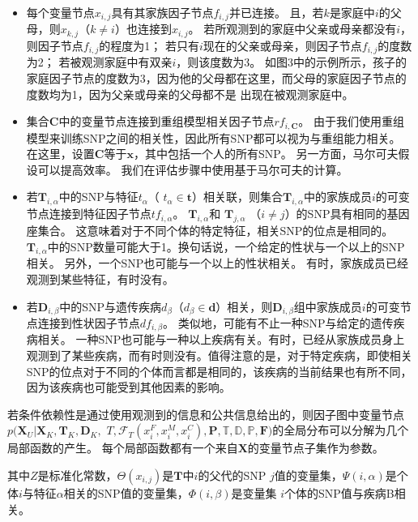 \begin{itemize}
	\item 每个变量节点$x_{i,j}$具有其家族因子节点$f_{i,j}$并已连接。 且，若$k$是家庭中$i$的父母，则$x_{k,j}$（$ k \neq i$）也连接到$x_{i,j}$。 若所观测到的家庭中父亲或母亲都没有$i$，则因子节点$f_{i,j}$的程度为1； 若只有$i$现在的父亲或母亲，则因子节点$f_{i,j}$的度数为2； 若被观测家庭中有双亲$i$，则该度数为3。 如图3中的示例所示，孩子的家庭因子节点的度数为3，因为他的父母都在这里，而父母的家庭因子节点的度数均为1，因为父亲或母亲的父母都不是 出现在被观测家庭中。
	\item 集合$\mathbf{C}$中的变量节点连接到重组模型相关因子节点$rf_{i,\mathbf{C}}$。 由于我们使用重组模型来训练SNP之间的相关性，因此所有SNP都可以视为与重组能力相关。 在这里，设置$\mathbf{C}$等于$\mathbf{x}$，其中包括一个人的所有SNP。 另一方面，马尔可夫假设可以提高效率。 我们在评估步骤中使用基于马尔可夫的计算。
	\item 若$\mathbf{T}_{i,\alpha}$中的SNP与特征$t_{\alpha}$（ $t_{\alpha} \in \mathbf{t}$）相关联，则集合$\mathbf{T}_{i,\alpha}$中的家族成员$i$的可变节点连接到特征因子节点$tf_{i,\alpha}$。 $\mathbf{T}_{i,\alpha}$和 $\mathbf{T}_{j,\alpha}$ （$i \neq j$）的SNP具有相同的基因座集合。 这意味着对于不同个体的特定特征，相关SNP的位点是相同的。 $\mathbf{T}_{i,\alpha}$中的SNP数量可能大于1。换句话说，一个给定的性状与一个以上的SNP相关。 另外，一个SNP也可能与一个以上的性状相关。 有时，家族成员已经观测到某些特征，有时没有。
	\item 若$\mathbf{D}_{i,\beta}$中的SNP与遗传疾病$d_{\beta}$（$d_{\beta} \in \mathbf{d}$）相关，则$\mathbf{D}_{i,\beta}$组中家族成员$i$的可变节点连接到性状因子节点$df_{i,\beta}$。 类似地，可能有不止一种SNP与给定的遗传疾病相关。 一种SNP也可能与一种以上疾病有关。有时，已经从家族成员身上观测到了某些疾病，而有时则没有。值得注意的是，对于特定疾病，即使相关SNP的位点对于不同的个体而言都是相同的，该疾病的当前结果也有所不同，因为该疾病也可能受到其他因素的影响。
	
\end{itemize}


若条件依赖性是通过使用观测到的信息和公共信息给出的，则因子图中变量节点$p(\mathbf{X}_U | \mathbf{X}_K, \mathbf{T}_K,\mathbf{D}_K,$ $T, \mathcal{F}_T(x_i^F, x_i^M, x_i^C), \mathbf{P}, \mathbb{T}, \mathbb{D}, \mathbb{P}, \mathbf{F})$的全局分布可以分解为几个局部函数的产生。 每个局部函数都有一个来自$\mathbf{X}$的变量节点子集作为参数。


其中$Z$是标准化常数，$\Theta(x_{i,j})$是$\mathbf{T}$中$i$的父代的SNP $j$值的变量集，$\Psi(i,\alpha)$是个体$i$与特征$\alpha$相关的SNP值的变量集，$\Phi(i,\beta)$是变量集 $i$个体的SNP值与疾病B相关。

